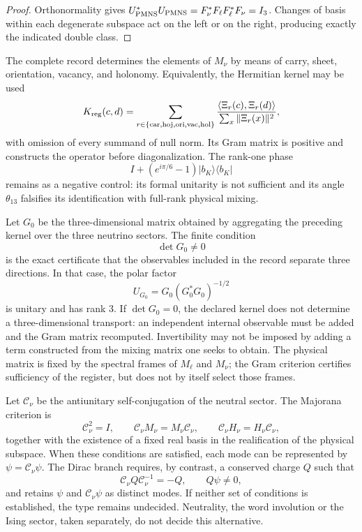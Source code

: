 \begin{proof}
Orthonormality gives
\(U_{\rm PMNS}^*U_{\rm PMNS}=F_\nu^*F_\ell F_\ell^*F_\nu=I_3\).
Changes of basis within each degenerate subspace act on the
left or on the right, producing exactly the indicated
double class.
\end{proof}

The complete record determines the elements of \(M_\nu\) by means of carry,
sheet, orientation, vacancy, and holonomy. Equivalently, the
Hermitian kernel may be used
\[
 K_{\rm reg}(c,d)
 =\sum_{r\in\{\rm car,hoj,ori,vac,hol\}}
 \frac{\langle\Xi_r(c),\Xi_r(d)\rangle}
      {\sum_x\|\Xi_r(x)\|^2},
\]
with omission of every summand of null norm. Its Gram matrix is positive and
constructs the operator before diagonalization. The rank-one phase
\[
 I+(e^{i\pi/6}-1)|b_K\rangle\langle b_K|
\]
remains as a negative control: its formal unitarity is not sufficient and its angle
\(\theta_{13}\) falsifies its identification with full-rank physical
mixing.

Let \(G_0\) be the three-dimensional matrix obtained by aggregating the preceding kernel
over the three neutrino sectors. The finite condition
\[
 \det G_0\ne0
\]
is the exact certificate that the observables included in the record
separate three directions. In that case, the polar factor
\[
 U_{G_0}=G_0(G_0^*G_0)^{-1/2}
\]
is unitary and has rank \(3\). If \(\det G_0=0\), the declared kernel does not
determine a three-dimensional transport: an independent internal observable
must be added and the Gram matrix recomputed. Invertibility may not be
imposed by adding a term constructed from the mixing matrix one seeks to obtain.
The physical matrix is fixed by the spectral frames of \(M_\ell\) and
\(M_\nu\); the Gram criterion certifies sufficiency of the register, but does not
by itself select those frames.

Let \(\mathcal C_\nu\) be the antiunitary self-conjugation of the neutral sector. The
Majorana criterion is
\[
 \mathcal C_\nu^2=I,
 \qquad
 \mathcal C_\nu M_\nu=M_\nu\mathcal C_\nu,
 \qquad
 \mathcal C_\nu H_\nu=H_\nu\mathcal C_\nu,
\]
together with the existence of a fixed real basis in the realification of the
physical subspace. When these conditions are satisfied, each mode can be
represented by \(\psi=\mathcal C_\nu\psi\). The Dirac branch requires, by
contrast, a conserved charge \(Q\) such that
\[
 \mathcal C_\nu Q\mathcal C_\nu^{-1}=-Q,
 \qquad Q\psi\ne0,
\]
and retains \(\psi\) and \(\mathcal C_\nu\psi\) as distinct modes. If neither
set of conditions is established, the type remains undecided.
Neutrality, the word involution or the Ising sector, taken
separately, do not decide this alternative.

